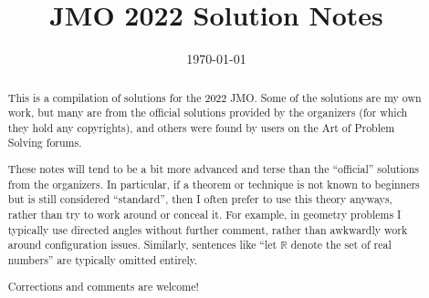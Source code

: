 \documentclass[11pt]{scrartcl}
\title{JMO 2022 Solution Notes}
\date{\today}
\begin{document}
\maketitle

\begin{abstract}
This is a compilation of solutions
for the 2022 JMO.
Some of the solutions are my own work,
but many are from the official solutions provided by the organizers
(for which they hold any copyrights),
and others were found by users on the Art of Problem Solving forums.

These notes will tend to be a bit more advanced and terse than the ``official''
solutions from the organizers.
In particular, if a theorem or technique is not known to beginners
but is still considered ``standard'', then I often prefer to
use this theory anyways, rather than try to work around or conceal it.
For example, in geometry problems I typically use directed angles
without further comment, rather than awkwardly work around configuration issues.
Similarly, sentences like ``let $\mathbb{R}$ denote the set of real numbers''
are typically omitted entirely.

Corrections and comments are welcome!
\end{abstract}

\tableofcontents
\newpage

\addtocounter{section}{-1}
\end{document}
